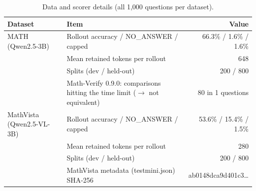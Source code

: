\begin{table}[t]
\centering
\small
\caption{Data and scorer details (all 1,000 questions per dataset).}
\label{tab:t3-data}
\begin{tabular}{llr}
\toprule
Dataset & Item & Value \\
\midrule
MATH (Qwen2.5-3B) & Rollout accuracy / NO\_ANSWER / capped & 66.3\% / 1.6\% / 1.6\% \\
 & Mean retained tokens per rollout & 648 \\
 & Splits (dev / held-out) & 200 / 800 \\
 & Math-Verify 0.9.0: comparisons hitting the time limit ($\to$ not equivalent) & 80 in 1 questions \\
MathVista (Qwen2.5-VL-3B) & Rollout accuracy / NO\_ANSWER / capped & 53.6\% / 15.4\% / 1.5\% \\
 & Mean retained tokens per rollout & 280 \\
 & Splits (dev / held-out) & 200 / 800 \\
 & MathVista metadata (testmini.json) SHA-256 & ab0148dca9d401c3… \\
\bottomrule
\end{tabular}
\end{table}
